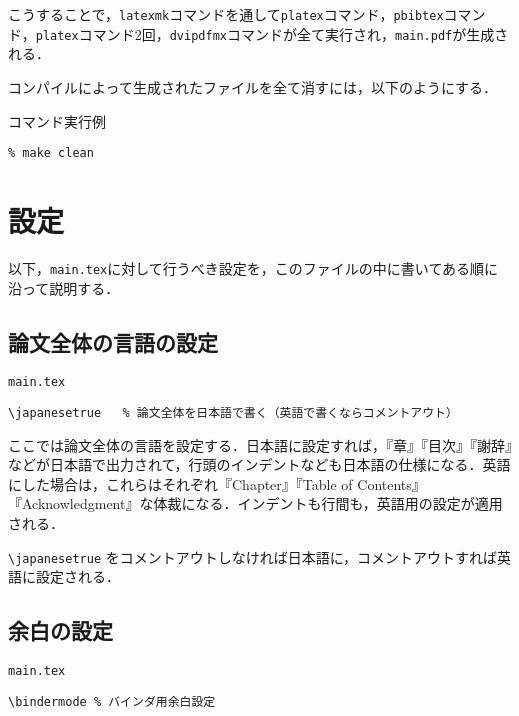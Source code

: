 こうすることで，\texttt{latexmk}コマンドを通して\texttt{platex}コマンド，\texttt{pbibtex}コマンド，\texttt{platex}コマンド2回，\texttt{dvipdfmx}コマンドが全て実行され，\texttt{main.pdf}が生成される．

コンパイルによって生成されたファイルを全て消すには，以下のようにする．

\begin{itembox}[l]{コマンド実行例}
\begin{verbatim}
% make clean
\end{verbatim}
\end{itembox}

\section{設定}

以下，\texttt{main.tex}に対して行うべき設定を，このファイルの中に書いてある順に沿って説明する．

\subsection{論文全体の言語の設定}
\label{sec:lang}

\begin{itembox}[l]{\texttt{main.tex}}
\begin{verbatim}
\japanesetrue	% 論文全体を日本語で書く（英語で書くならコメントアウト）
\end{verbatim}
\end{itembox}

ここでは論文全体の言語を設定する．日本語に設定すれば，『章』『目次』『謝辞』などが日本語で出力されて，行頭のインデントなども日本語の仕様になる．英語にした場合は，これらはそれぞれ『Chapter』『Table of Contents』『Acknowledgment』な体裁になる．インデントも行間も，英語用の設定が適用される．

\verb|\japanesetrue| をコメントアウトしなければ日本語に，コメントアウトすれば英語に設定される．


\subsection{余白の設定}

\begin{itembox}[l]{\texttt{main.tex}}
\begin{verbatim}
\bindermode	% バインダ用余白設定
\end{verbatim}
\end{itembox}


